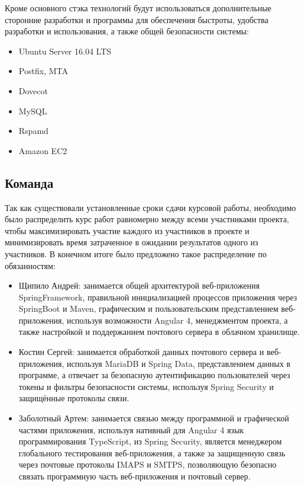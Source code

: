 \documentclass{article}
\begin{document}
Кроме основного стэка технологий будут использоваться дополнительные сторонние разработки и программы для обеспечения быстроты, удобства разработки и использования, а также общей безопасности системы: \\

\begin{itemize}
\item Ubuntu Server 16.04 LTS
\item Postfix, MTA
\item Dovecot
\item MySQL
\item Rspamd
\item Amazon EC2
\end{itemize}

\subsection{Команда}
Так как существовали установленные сроки сдачи курсовой работы, необходимо было распределить курс работ равномерно между всеми участниками проекта, чтобы максимизировать участие каждого из участников в проекте и минимизировать время затраченное в ожидании результатов одного из участников.
В конечном итоге было предложено такое распределение по обязанностям:
\begin{itemize}
\item Щипило Андрей: занимается общей архитектурой веб-приложения SpringFramework, правильной инициализацией процессов приложения через SpringBoot и Maven, графическим и пользовательским представлением веб-приложения, используя возможности Angular 4, менеджментом проекта, а также настройкой и поддержанием почтового сервера в облачном хранилище.

\item Костин Сергей: занимается обработкой данных почтового сервера и веб-приложения, используя MariaDB и Spring Data, представлением данных в программе, а отвечает за безопасную аутентификацию пользователей через токены и фильтры безопасности системы, используя Spring Security и защищённые протоколы связи.

\item Заболотный Артем: занимается связью между программной и графической частями приложения, используя нативный для Angular 4 язык программирования TypeScript,  из Spring Security, является менеджером глобального тестирования веб-приложения, а также за защищенную связь через почтовые протоколы IMAPS и SMTPS, позволяющую безопасно связать программную часть веб-приложения и почтовый сервер.
\end{itemize}
\newpage
\end{document}
